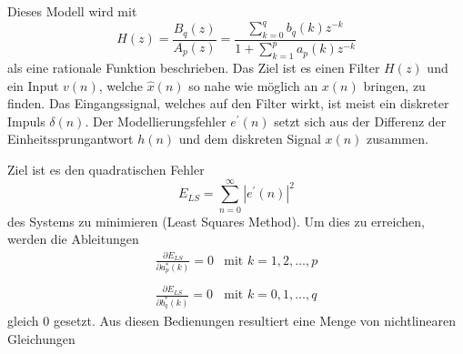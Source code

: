Dieses Modell wird mit
\begin{equation}
H(z)
=
\frac{B_{q}(z)}{A_{p}(z)}
=
\frac{\sum_{k=0}^{q} b_{q}(k) z^{-k}}{1+\sum_{k=1}^{p} a_{p}(k) z^{-k}}
\end{equation}
als eine rationale Funktion beschrieben.
Das Ziel ist es einen Filter $H(z)$ und ein Input $v(n)$, welche $\hat{x}(n)$ so nahe wie möglich an $x(n)$ bringen, zu finden.
Das Eingangssignal, welches auf den Filter wirkt, ist meist ein diskreter Impuls $\delta(n)$.
Der Modellierungsfehler $e^{\prime}(n)$ setzt sich aus der Differenz der Einheitssprungantwort $h(n)$ und dem diskreten Signal $x(n)$ zusammen.
\begin{center}
	\tikzset{>=latex}
\end{center}
Ziel ist es den quadratischen Fehler 
\begin{equation}
E_{L S}
=
\sum_{n=0}^{\infty}\left|e^{\prime}(n)\right|^{2}
\end{equation}
des Systems zu minimieren (Least Squares Method).
Um dies zu erreichen, werden die Ableitungen   
\begin{equation}\begin{array}{ll}
\frac{\partial E_{L S}}{\partial a_{p}^{*}(k)}
=
0 
& 
\text{mit } k=1,2, \ldots, p \\
&\\

\frac{\partial E_{L S}}{\partial b_{q}^{*}(k)}
=
0  
&
 \text{mit } k=0,1, \ldots, q
\end{array}\end{equation}
gleich 0 gesetzt.
Aus diesen Bedienungen resultiert eine Menge von nichtlinearen Gleichungen 

